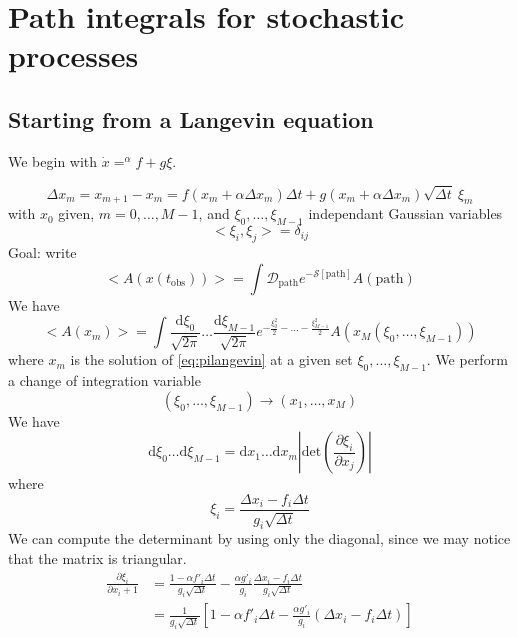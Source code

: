\documentclass[a4paper]{book}
\theoremstyle{definition}
\theoremstyle{remark}
\begin{document}
\section{Path integrals for stochastic processes}
\subsection{Starting from a Langevin equation}
We begin with $\dot{x} =^\alpha f+g\xi$. 

\begin{equation}
    \Delta x_m = x_{m+1} - x_m = f(x_m + \alpha \Delta x_m) \Delta t + g(x_m + \alpha \Delta x_m)\sqrt{\Delta t}~\xi_m
\label{eq:pilangevin}\end{equation}
with $x_0$ given, $m = 0, \dots, M-1$, and $\xi_0, \dots, \xi_{M-1}$ independant Gaussian variables 
\begin{equation}
    <\xi_i, \xi_j> = \delta_{ij}
\end{equation}
Goal: write 
\begin{equation}
    <A(x(t_{\text{obs}}))> = \int \mathcal{D}_{\text{path}} e^{-\mathcal{S}[\text{path}]}A(\text{path})    
\end{equation} 
We have 
\begin{equation}
    <A(x_m)> = \int \frac{\text{d}\xi_0}{\sqrt{2\pi}}\dots\frac{\text{d}\xi_{M-1}}{\sqrt{2\pi}} e^{-\frac{\xi_0^2}{2}-\dots-\frac{\xi_{M-1}^2}{2} } A(x_M(\xi_0, \dots, \xi_{M-1}))
\end{equation}
where $x_m$ is the solution of \eqref{eq:pilangevin} at a given set $\xi_0, \dots, \xi_{M-1}$.
We perform a change of integration variable 
\begin{equation}
    (\xi_0, \dots, \xi_{M-1}) \rightarrow (x_1,\dots , x_M)
\end{equation}
We have 
\begin{equation}
    \text{d}\xi_0 \dots \text{d}\xi_{M-1} = \text{d}x_1 \dots \text{d}x_m \left|  \text{det}\left(\frac{\partial\xi_i}{\partial x_j}\right)\right|
\end{equation}
where 
\begin{equation}
    \xi_i = \frac{\Delta x_i - f_i \Delta t}{g_i \sqrt{\Delta t}}
\end{equation}
We can compute the determinant by using only the diagonal, since we may notice that the matrix is triangular. 
\begin{equation}
    \begin{aligned}
        \frac{\partial \xi_i}{\partial x_i+1} &= \frac{1 - \alpha f'_i\Delta t}{g_i \sqrt{\Delta t}} - \frac{\alpha g'_i}{g_i}\frac{\Delta x_i - f_i \Delta t}{g_i \sqrt{\Delta t}} \\
        &= \frac{1}{g_i \sqrt{\Delta t}}[1 - \alpha f'_i \Delta t - \frac{\alpha g'_i}{g_i}(\Delta x_i - f_i \Delta t)]
    \end{aligned}
\end{equation}
\end{document}
